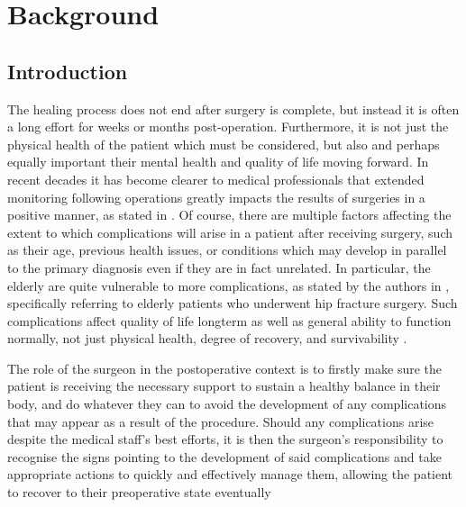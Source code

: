 \chapter{Background}

\section{Introduction} %
The healing process does not end after surgery is complete, but instead it is often a long effort for weeks or months post-operation. Furthermore, it is not just the physical health of the patient which must be considered, but also and perhaps equally important their mental health and quality of life moving forward. In recent decades it has become clearer to medical professionals that extended monitoring following operations greatly impacts the results of surgeries in a positive manner, as stated in \cite{d2014defining}. Of course, there are multiple factors affecting the extent to which complications will arise in a patient after receiving surgery, such as their age, previous health issues, or conditions which may develop in parallel to the primary diagnosis even if they are in fact unrelated. In particular, the elderly are quite vulnerable to more complications, as stated by the authors in \cite{kare2024post}, specifically referring to elderly patients who underwent hip fracture surgery. Such complications affect quality of life longterm as well as general ability to function normally, not just physical health, degree of recovery, and survivability \cite{kare2024post}.

The role of the surgeon in the postoperative context is to firstly make sure the patient is receiving the necessary support to sustain a healthy balance in their body, and do whatever they can to avoid the development of any complications that may appear as a result of the procedure. Should any complications arise despite the medical staff's best efforts, it is then the surgeon's responsibility to recognise the signs pointing to the development of said complications and take appropriate actions to quickly and effectively manage them, allowing the patient to recover to their preoperative state eventually \cite{Surwit_Tam_2008}

